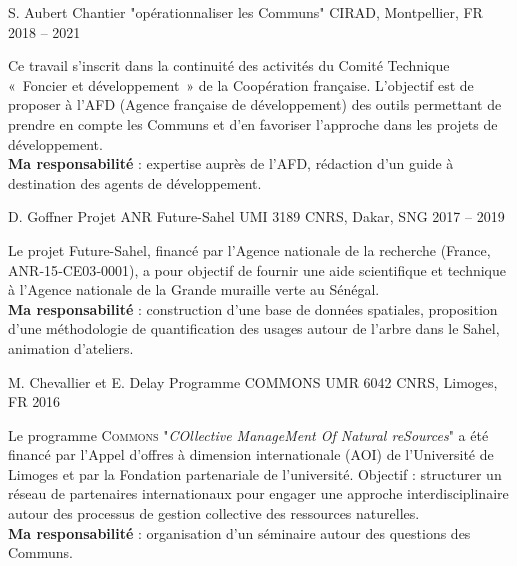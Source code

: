\begin{cventries}
  \cventry
  {S. Aubert} %
  {Chantier "opérationnaliser les Communs"} %
  {CIRAD, Montpellier, FR} %
  {2018 -- 2021} %
  {
    \begin{cvitems} %
      Ce travail s’inscrit dans la continuité des activités du Comité Technique « Foncier et développement » de la Coopération française. L’objectif est de proposer à l’AFD (Agence française de développement) des outils permettant de prendre en compte les Communs et d’en favoriser l’approche dans les projets de développement.\\
      \textbf{Ma responsabilité} : expertise auprès de l'AFD, rédaction d'un guide à destination des agents de développement.
    \end{cvitems}
  }

  \cventry
  {D. Goffner} %
  {Projet ANR Future-Sahel} %
  {UMI 3189 CNRS, Dakar, SNG} %
  {2017 -- 2019} %
  {
    \begin{cvitems} %
    Le projet Future-Sahel, financé par l’Agence nationale de la recherche (France, ANR‑15‑CE03‑0001), a pour objectif de fournir une aide scientifique et technique à l’Agence nationale de la Grande muraille verte au Sénégal.\\
    \textbf{Ma responsabilité} : construction d’une base de données spatiales, proposition d’une méthodologie de quantification des usages autour de l’arbre dans le Sahel, animation d’ateliers.
    \end{cvitems}
  }

  \cventry
  {M. Chevallier et E. Delay} %
  {Programme COMMONS} %
  {UMR 6042 CNRS, Limoges, FR} %
  {2016} %
  {
    \begin{cvitems} %
      Le programme \textsc{Commons} "\textit{COllective ManageMent Of Natural reSources}" a été financé par l’Appel d’offres à dimension internationale (AOI) de l’Université de Limoges et par la Fondation partenariale de l’université. Objectif : structurer un réseau de partenaires internationaux pour engager une approche interdisciplinaire autour des processus de gestion collective des ressources naturelles.\\
      \textbf{Ma responsabilité} : organisation d'un séminaire autour des questions des Communs.
    \end{cvitems}
  }


\end{cventries}
